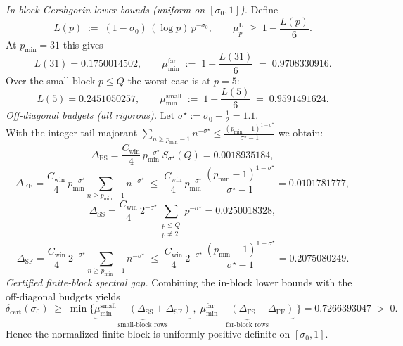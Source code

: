 \documentclass[11pt]{article}
\theoremstyle{definition}
\theoremstyle{remark}
\begin{document}
\noindent\emph{In-block Gershgorin lower bounds (uniform on \([\sigma_0,1]\)).}
Define
\[
L(p)\;:=\;(1-\sigma_0)\,(\log p)\,p^{-\sigma_0},\qquad 
\mu_p^{\mathrm L}\;\ge\;1-\frac{L(p)}{6}.
\]
At \(p_{\min}=31\) this gives
\[
L(31)=0.1750014502,\qquad 
\mu_{\min}^{\mathrm{far}}\;:=\;1-\frac{L(31)}{6}\;=\;0.9708330916.
\]
Over the small block \(p\le Q\) the worst case is at \(p=5\):
\[
L(5)=0.2451050257,\qquad 
\mu_{\min}^{\mathrm{small}}\;:=\;1-\frac{L(5)}{6}\;=\;0.9591491624.
\]
\noindent\emph{Off-diagonal budgets (all rigorous).}
Let \(\sigma^\star:=\sigma_0+\tfrac12=1.1\).\\
With the integer-tail majorant \(\displaystyle \sum_{n\ge p_{\min}-1} n^{-\sigma^\star}\le
\frac{(p_{\min}-1)^{1-\sigma^\star}}{\sigma^\star-1}\)
we obtain:
\[
\Delta_{\mathrm{FS}}
=\frac{C_{\mathrm{win}}}{4}\,p_{\min}^{-\sigma^\star}\,S_{\sigma^\star}(Q)
=0.0018935184,
\]
\[
\Delta_{\mathrm{FF}}
=\frac{C_{\mathrm{win}}}{4}\,p_{\min}^{-\sigma^\star}\!
\sum_{n\ge p_{\min}-1}\! n^{-\sigma^\star}
\;\le\;\frac{C_{\mathrm{win}}}{4}\,p_{\min}^{-\sigma^\star}\,
\frac{(p_{\min}-1)^{1-\sigma^\star}}{\sigma^\star-1}
=0.0101781777,
\]
\[
\Delta_{\mathrm{SS}}
=\frac{C_{\mathrm{win}}}{4}\,2^{-\sigma^\star}
\!\sum_{\substack{p\le Q\\ p\neq 2}}\! p^{-\sigma^\star}
=0.0250018328,
\]
\[
\Delta_{\mathrm{SF}}
=\frac{C_{\mathrm{win}}}{4}\,2^{-\sigma^\star}\!
\sum_{n\ge p_{\min}-1}\! n^{-\sigma^\star}
\;\le\;\frac{C_{\mathrm{win}}}{4}\,2^{-\sigma^\star}\,
\frac{(p_{\min}-1)^{1-\sigma^\star}}{\sigma^\star-1}
=0.2075080249.
\]
\noindent\emph{Certified finite-block spectral gap.}
Combining the in-block lower bounds with the off-diagonal budgets yields
\[
\delta_{\mathrm{cert}}(\sigma_0)\;\ge\;
\min\Big\{
\underbrace{\mu_{\min}^{\mathrm{small}}-(\Delta_{\mathrm{SS}}+\Delta_{\mathrm{SF}})}_{\text{small-block rows}}\,,\;
\underbrace{\mu_{\min}^{\mathrm{far}}-(\Delta_{\mathrm{FS}}+\Delta_{\mathrm{FF}})}_{\text{far-block rows}}\
\Big\}
=0.7266393047\;>\;0.
\]
Hence the normalized finite block is uniformly positive definite on \([\sigma_0,1]\).
\end{document}
